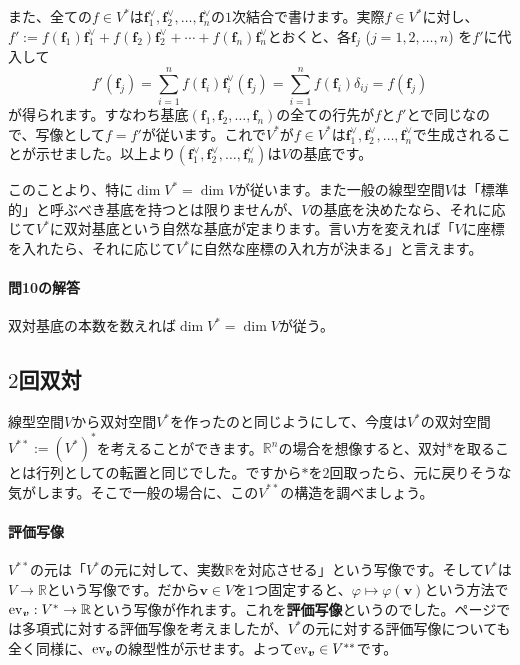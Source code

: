 また、全ての$f \in V^*$は$\bm{f}^{\vee}_1, \bm{f}^{\vee}_2, \ldots, \bm{f}^{\vee}_n$の$1$次結合で書けます。実際$f \in V^*$に対し、$f' := f(\bm{f}_1)\bm{f}^{\vee}_1 + f(\bm{f}_2)\bm{f}^{\vee}_2 + \cdots + f(\bm{f}_n)\bm{f}^{\vee}_n$とおくと、各$\bm{f}_j$ ($j = 1, 2, \ldots, n$) を$f'$に代入して
\[
f'(\bm{f}_j) = \sum_{i = 1}^n f(\bm{f}_i)\bm{f}^{\vee}_i(\bm{f}_j) = \sum_{i = 1}^n f(\bm{f}_i) \delta_{ij} = f(\bm{f}_j)
\]
が得られます。すなわち基底$(\bm{f}_1, \bm{f}_2, \ldots, \bm{f}_n)$の全ての行先が$f$と$f'$とで同じなので、写像として$f = f'$が従います。これで$V^*$が$f \in V^*$は$\bm{f}^{\vee}_1, \bm{f}^{\vee}_2, \ldots, \bm{f}^{\vee}_n$で生成されることが示せました。以上より$(\bm{f}^{\vee}_1, \bm{f}^{\vee}_2, \ldots, \bm{f}^{\vee}_n)$は$V$の基底です。

このことより、特に$\dim V^* = \dim V$が従います。また一般の線型空間$V$は「標準的」と呼ぶべき基底を持つとは限りませんが、$V$の基底を決めたなら、それに応じて$V^*$に双対基底という自然な基底が定まります。言い方を変えれば「$V$に座標を入れたら、それに応じて$V^*$に自然な座標の入れ方が決まる」と言えます。


\paragraph{問10の解答} 双対基底の本数を数えれば$\dim V^* = \dim V$が従う。

\subsection{$2$回双対}

線型空間$V$から双対空間$V^*$を作ったのと同じようにして、今度は$V^*$の双対空間$V^{**} := (V^*)^*$を考えることができます。$\mathbb{R}^n$の場合を想像すると、双対$*$を取ることは行列としての転置と同じでした。ですから$*$を$2$回取ったら、元に戻りそうな気がします。そこで一般の場合に、この$V^{**}$の構造を調べましょう。

\paragraph{評価写像} $V^{**}$の元は「$V^{*}$の元に対して、実数$\mathbb{R}$を対応させる」という写像です。そして$V^{*}$は$V\rightarrow\mathbb{R}$という写像です。だから$\bm{v} \in V$を$1$つ固定すると、$\varphi\mapsto \varphi(\bm{v})$という方法で$\operatorname{ev}_{\boldsymbol{v}}:V^{*}\rightarrow \mathbb{R}$という写像が作れます。これを\textbf{評価写像}というのでした。\pageref{paragraph:evaluation_map}ページでは多項式に対する評価写像を考えましたが、$V^*$の元に対する評価写像についても全く同様に、$\operatorname{ev}_{\boldsymbol{v}}$の線型性が示せます。よって$\operatorname{ev}_{\boldsymbol{v}}\in V^{**}$です。

